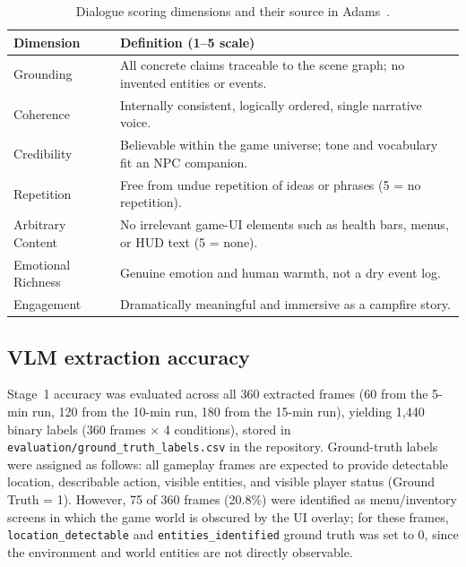 \documentclass{article}
\begin{document}
\begin{table}[htbp]
\centering
\caption{Dialogue scoring dimensions and their source in Adams~\cite{Adams2014}.}
\label{tab:dimensions}
\begin{tabular}{l>{\raggedright\arraybackslash}p{5cm}}
\toprule
Dimension & Definition (1--5 scale) \\
\midrule
Grounding         & All concrete claims traceable to the scene graph; no invented entities or events. \\
Coherence         & Internally consistent, logically ordered, single narrative voice. \\
Credibility       & Believable within the game universe; tone and vocabulary fit an NPC companion. \\
Repetition        & Free from undue repetition of ideas or phrases (5 = no repetition). \\
Arbitrary Content & No irrelevant game-UI elements such as health bars, menus, or HUD text (5 = none). \\
Emotional Richness & Genuine emotion and human warmth, not a dry event log. \\
Engagement        & Dramatically meaningful and immersive as a campfire story. \\
\bottomrule
\end{tabular}
\end{table}

\subsection{VLM extraction accuracy}

Stage~1 accuracy was evaluated across all 360 extracted frames (60 from the 5-min run, 120 from the 10-min run, 180 from the 15-min run), yielding 1{,}440 binary labels (360 frames $\times$ 4 conditions), stored in\\ \texttt{evaluation/ground\_truth\_labels.csv} in the repository. Ground-truth labels were assigned as follows: all gameplay frames are expected to provide detectable location, describable action, visible entities, and visible player status (Ground Truth = 1). However, 75 of 360 frames (20.8\%) were identified as menu/inventory screens in which the game world is obscured by the UI overlay; for these frames, \texttt{location\_detectable} and \texttt{entities\_identified} ground truth was set to 0, since the environment and world entities are not directly observable.
\end{document}

